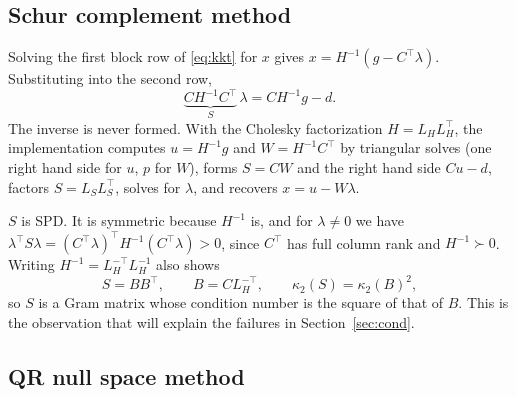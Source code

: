 \documentclass[10pt]{article}
\newcommand{\kap}{\kappa_2}
\begin{document}
\subsection{Schur complement method}

Solving the first block row of \eqref{eq:kkt} for $x$ gives $x=H^{-1}(g-C^\top\lambda)$.
Substituting into the second row,
\begin{equation}\label{eq:schur}
\underbrace{CH^{-1}C^\top}_{S}\,\lambda = CH^{-1}g - d .
\end{equation}
The inverse is never formed. With the Cholesky factorization $H=L_HL_H^\top$, the
implementation computes $u=H^{-1}g$ and $W=H^{-1}C^\top$ by triangular solves (one
right hand side for $u$, $p$ for $W$), forms $S=CW$ and the right hand side $Cu-d$,
factors $S=L_SL_S^\top$, solves for $\lambda$, and recovers $x=u-W\lambda$.

$S$ is SPD. It is symmetric because $H^{-1}$ is, and for $\lambda\neq0$ we have
$\lambda^\top S\lambda=(C^\top\lambda)^\top H^{-1}(C^\top\lambda)>0$, since $C^\top$ has
full column rank and $H^{-1}\succ0$. Writing $H^{-1}=L_H^{-\top}L_H^{-1}$ also shows
\begin{equation}\label{eq:gram}
S = BB^\top,\qquad B = CL_H^{-\top},\qquad \kap(S)=\kap(B)^2 ,
\end{equation}
so $S$ is a Gram matrix whose condition number is the square of that of $B$. This is the
observation that will explain the failures in Section~\ref{sec:cond}.

\subsection{QR null space method}
\end{document}
